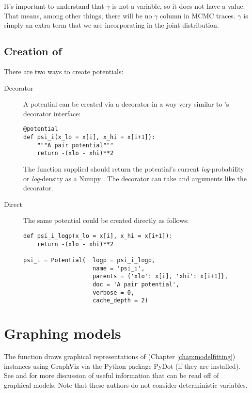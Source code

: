 It's important to understand that $\gamma$ is not a variable, so it does not have a value. That means, among other things, there will be no $\gamma$ column in MCMC traces. $\gamma$ is simply an extra term that we are incorporating in the joint distribution.


\subsection*{Creation of }
There are two ways to create potentials:
\begin{description}
    \item[Decorator] A potential can be created via a decorator in a way very similar to 's decorator interface:
\begin{verbatim}
@potential
def psi_i(x_lo = x[i], x_hi = x[i+1]):
    """A pair potential"""
    return -(xlo - xhi)**2
\end{verbatim}
The function supplied should return the potential's current \emph{log}-probability or \emph{log}-density as a Numpy . The  decorator can take  and  arguments like the  decorator.
    \item[Direct] The same potential could be created directly as follows:
\begin{verbatim}
def psi_i_logp(x_lo = x[i], x_hi = x[i+1]):
    return -(xlo - xhi)**2
        
psi_i = Potential(  logp = psi_i_logp, 
                    name = 'psi_i',
                    parents = {'xlo': x[i], 'xhi': x[i+1]},
                    doc = 'A pair potential',
                    verbose = 0,
                    cache_depth = 2)
\end{verbatim}
\end{description}


\hypertarget{graphical}{}
\section*{Graphing models} \label{graphical}

The function  draws graphical representations of  (Chapter \ref{chap:modelfitting}) instances using GraphViz via the Python package PyDot (if they are installed). See \cite{dawidmarkov} and \cite{Jordan:2004p5439} for more discussion of useful information that can be read off of graphical models. Note that these authors do not consider deterministic variables.

